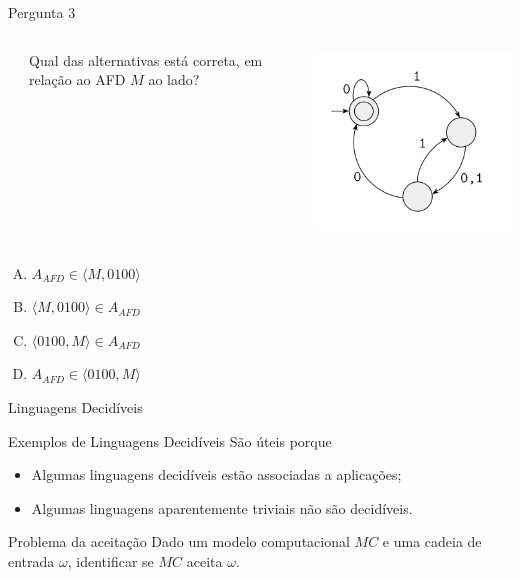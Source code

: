 \documentclass[xcolor=dvipsnames,table]{beamer}
\begin{document}
	\begin{frame}
		\begin{block}{Pergunta 3}
			\begin{columns}
				\begin{column}{0.05\textwidth}\end{column}
				\begin{column}{0.45\textwidth}
					Qual das alternativas está correta, em relação ao AFD $M$ ao lado?
				\end{column}
				\begin{column}{0.5\textwidth}  %
					\begin{center}
						\includegraphics[width=.7\textwidth]{images/afd}
					\end{center}
				\end{column}
			\end{columns}
			\begin{center}
				
			\end{center}
		\end{block}
		\begin{enumerate}[(A)]
			\item $A_{AFD} \in \langle M, 0100 \rangle$
			\item $\langle M, 0100 \rangle \in A_{AFD}$ 
			\item $\langle 0100, M \rangle \in A_{AFD}$
			\item $A_{AFD} \in \langle 0100, M \rangle$
		\end{enumerate}
	\end{frame}

	\begin{frame}{Linguagens Decidíveis}
		\begin{block}{Exemplos de Linguagens Decidíveis}
			São úteis porque
			\begin{itemize}
				\item Algumas linguagens decidíveis estão associadas a aplicações;
				\item Algumas linguagens aparentemente triviais não são decidíveis.
			\end{itemize}
		\end{block}  
		\begin{block}{Problema da aceitação}
			Dado um modelo computacional $MC$ e uma cadeia de entrada $\omega$, identificar se $MC$ aceita $\omega$.
		\end{block}	
	\end{frame}
	
\end{document}

